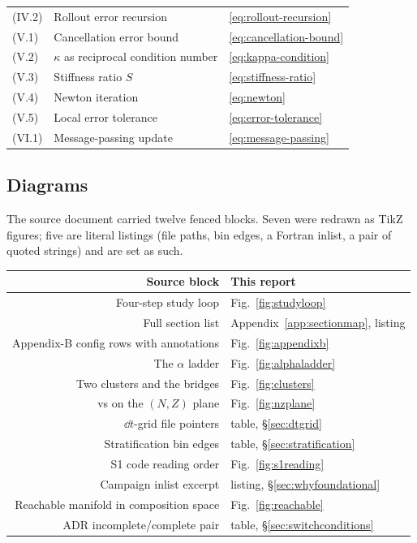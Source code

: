\begin{longtable}{@{}l p{7.4cm} l@{}}
(IV.2) & Rollout error recursion & \eqref{eq:rollout-recursion} \\
(V.1)  & Cancellation error bound & \eqref{eq:cancellation-bound} \\
(V.2)  & $\kappa$ as reciprocal condition number &
         \eqref{eq:kappa-condition} \\
(V.3)  & Stiffness ratio $S$ & \eqref{eq:stiffness-ratio} \\
(V.4)  & Newton iteration & \eqref{eq:newton} \\
(V.5)  & Local error tolerance & \eqref{eq:error-tolerance} \\
(VI.1) & Message-passing update & \eqref{eq:message-passing} \\
\end{longtable}
\endgroup

\subsection{Diagrams}

The source document carried twelve fenced blocks. Seven were redrawn as TikZ
figures; five are literal listings (file paths, bin edges, a Fortran inlist, a
pair of quoted strings) and are set as such.

\begin{center}
\small
\begin{tabularx}{\textwidth}{@{}R{1.000} l@{}}
\toprule
\textbf{Source block} & \textbf{This report} \\
\midrule
Four-step study loop & Fig.~\ref{fig:studyloop} \\
Full section list & Appendix~\ref{app:sectionmap}, listing \\
Appendix-B config rows with annotations & Fig.~\ref{fig:appendixb} \\
The $\alpha$ ladder & Fig.~\ref{fig:alphaladder} \\
Two clusters and the bridges & Fig.~\ref{fig:clusters} \\
 vs  on the $(N,Z)$ plane & Fig.~\ref{fig:nzplane} \\
$\dd t$-grid file pointers & table, \S\ref{sec:dtgrid} \\
Stratification bin edges & table, \S\ref{sec:stratification} \\
S1 code reading order & Fig.~\ref{fig:s1reading} \\
Campaign inlist excerpt & listing, \S\ref{sec:whyfoundational} \\
Reachable manifold in composition space & Fig.~\ref{fig:reachable} \\
ADR incomplete/complete pair & table, \S\ref{sec:switchconditions} \\
\bottomrule
\end{tabularx}
\end{center}
